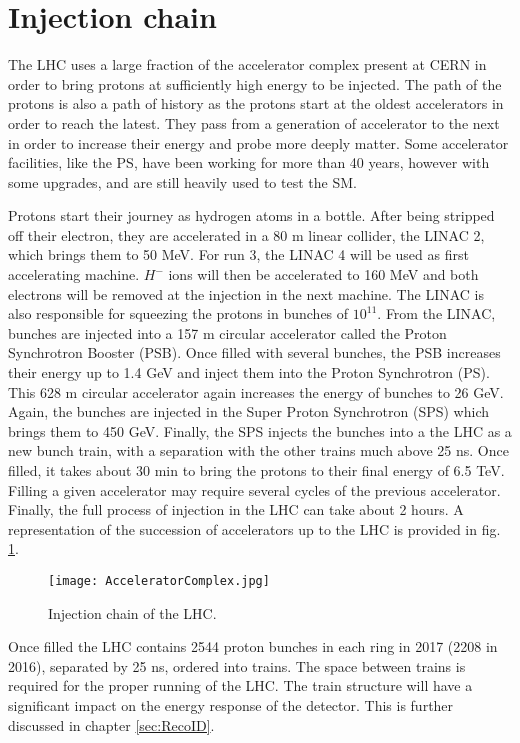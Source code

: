 \section{Injection chain}
\label{sec:org3f71f89}

The LHC uses a large fraction of the accelerator complex present at CERN in order to bring protons at sufficiently high energy to be injected.
The path of the protons is also a path of history as the protons start at the oldest accelerators in order to reach the latest.
They pass from a generation of accelerator to the next in order to increase their energy and probe more deeply matter.
Some accelerator facilities, like the PS, have been working for more than 40 years, however with some upgrades,  and are still heavily used to test the SM.

Protons start their journey as hydrogen atoms in a bottle.
After being stripped off their electron, they are accelerated in a 80 m linear collider, the LINAC 2, which brings them to 50 MeV.
For run 3, the LINAC 4 will be used as first accelerating machine.
$H^-$ ions will then be accelerated to 160 MeV and both electrons will be removed at the injection in the next machine.
The LINAC is also responsible for squeezing the protons in bunches of \(10^{11}\).
From the LINAC, bunches are injected into a 157 m circular accelerator called the Proton Synchrotron Booster (PSB).
Once filled with several bunches, the PSB increases their energy up to 1.4 GeV and inject them into the Proton Synchrotron (PS).
This 628 m circular accelerator again increases the energy of bunches to 26 GeV.
Again, the bunches are injected in the Super Proton Synchrotron (SPS) which brings them to 450 GeV.
Finally, the SPS injects the bunches into a the LHC as a new bunch train, with a separation with the other trains much above 25 ns.
Once filled, it takes about 30 min to bring the protons to their final energy of 6.5 TeV.
Filling a given accelerator may require several cycles of the previous accelerator.
Finally, the full process of injection in the LHC can take about 2 hours.
A representation of the succession of accelerators up to the LHC is provided in fig. \ref{fig:orgc7a6b45}.

\begin{figure}[htbp]
\centering
\texttt{[image: AcceleratorComplex.jpg]}
\caption{\label{fig:orgc7a6b45}
Injection chain of the LHC.\cite{AcceleratorComplex}}
\end{figure}


Once filled the LHC contains 2544 proton bunches in each ring in 2017 (2208 in 2016), separated by 25 ns, ordered into trains.
The space between trains is required for the proper running of the LHC.
The train structure will have a significant impact on the energy response of the detector.
This is further discussed in chapter \ref{sec:RecoID}.


